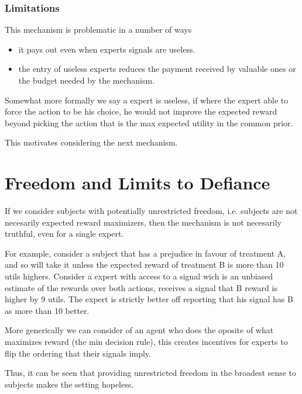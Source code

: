 \subsubsection{Limitations}
This mechanism is problematic in a number of ways

\begin{itemize}
\item it pays out even when experts signals are useless.
\item the entry of useless experts reduces the payment received by valuable ones or the budget needed by the mechanism.
\end{itemize}

Somewhat more formally we say a expert is useless, if where the expert able to force the action to be his choice, he would not improve the expected reward beyond picking the action that is the max expected utility in the common prior.

This motivates considering the next mechanism.


\section{Freedom and Limits to Defiance}

If we consider subjects with potentially unrestricted freedom, i.e. subjects are not necesarily expected reward maximizers, then the mechanism is not necesarily truthful, even for a single expert. 

\begin{eg}
	For example, consider a subject that has a prejudice in favour of treatment A, and so will take it unless the expected reward of treatment B is more than 10 utils highers. Consider a expert with access to a signal wich is an unbiased estimate of the rewards over both actions, receives a signal  that B reward is higher by 9 utils. The expert is strictly better off reporting that his signal has B as more than 10 better.
\end{eg}

\begin{eg}
	More generically we can consider of an agent who does the oposite of what maximizes reward (the min decision rule), this creates incentives for experts to flip the ordering that their signals imply. 
\end{eg}

Thus, it can be seen that providing unrestricted freedom in the broadest sense to subjects makes the setting hopeless. 

